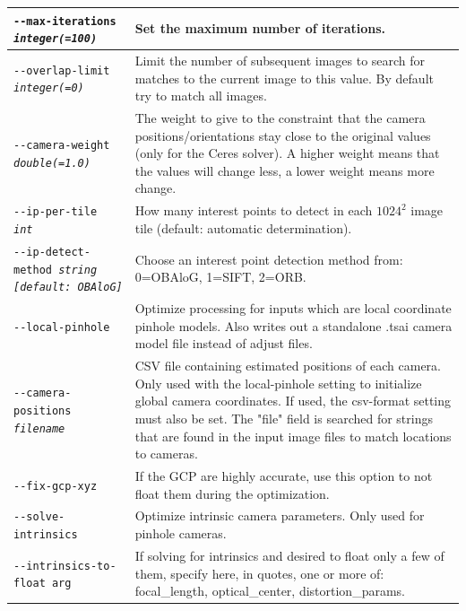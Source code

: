 \begin{longtable}{|l|p{7.5cm}|}
\texttt{-\/-max-iterations \textit{integer(=100)}} & Set the maximum
number of iterations. \\ \hline

\texttt{-\/-overlap-limit \textit{integer(=0)}} & Limit the number of
subsequent images to search for matches to the current image to this
value.  By default try to match all images.\\ \hline


\texttt{-\/-camera-weight \textit{double(=1.0)}} &
The weight to give to the constraint that the camera positions/orientations stay close to
the original values (only for the Ceres solver).  A higher weight means that the values will
change less, a lower weight means more change.
\\ \hline

\texttt{-\/-ip-per-tile \textit{int}} &
How many interest points to detect in each $1024^2$ image tile (default: automatic
determination).
\\ \hline

\texttt{-\/-ip-detect-method \textit{string [default: OBAloG]}} & Choose an interest point
detection method from: 0=OBAloG, 1=SIFT, 2=ORB. \\ \hline

\texttt{-\/-local-pinhole} & Optimize processing for inputs which are local coordinate pinhole models.
Also writes out a standalone .tsai camera model file instead of adjust files. \\ \hline

\texttt{-\/-camera-positions \textit{filename}} & CSV file containing estimated positions of each camera.
Only used with the local-pinhole setting to initialize global camera coordinates. If used,
the csv-format setting must also be set.  The "file" field is searched for strings that are found
in the input image files to match locations to cameras.\\ \hline

\texttt{-\/-fix-gcp-xyz} & If the GCP are highly accurate, use this option to not float them during the optimization.\\ \hline

\texttt{-\/-solve-intrinsics} & Optimize intrinsic camera parameters. Only used for pinhole cameras.\\ \hline

\texttt{-\/-intrinsics-to-float arg} & If solving for intrinsics and desired to float only a few of them, specify here, in quotes, one or more of: focal\_length, optical\_center, distortion\_params.\\ \hline


\end{longtable}
